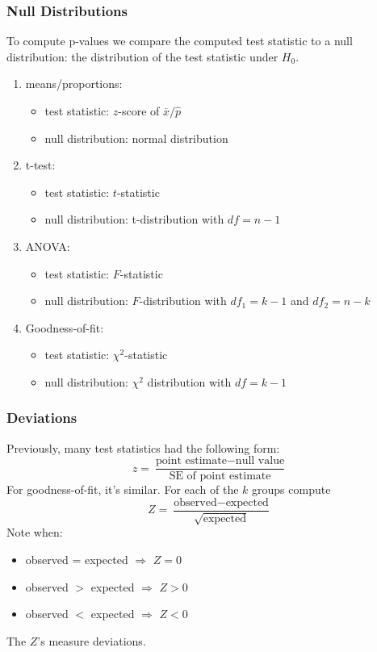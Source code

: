 \documentclass[handout]{beamer}
\newcommand{\blue}[1]{\textcolor{blue2}{#1}}
\newcommand{\xbar}{\overline{x}}
\begin{document}
\begin{frame}[fragile]
\frametitle{Null Distributions}
To compute p-values we compare the \blue{computed test statistic} to a \blue{null distribution}:  the distribution of the test statistic under $H_0$.

\begin{enumerate}
\pause\item \blue{means/proportions}:
\begin{itemize}
\item test statistic: $z$-score of $\xbar / \widehat{p}$
\item null distribution: normal distribution
\end{itemize}
\pause\item \blue{t-test}:  
\begin{itemize}
\item test statistic: $t$-statistic
\item null distribution: t-distribution with $df=n-1$
\end{itemize}
\pause\item \blue{ANOVA}:  
\begin{itemize}
\item test statistic: $F$-statistic 
\item null distribution: $F$-distribution with $df_1=k-1$ and $df_2 = n-k$
\end{itemize}
\pause\item \blue{Goodness-of-fit}:
\begin{itemize}
\item test statistic: $\chi^2$-statistic
\item null distribution: $\chi^2$ distribution with $df=k-1$
\end{itemize}
\end{enumerate}

\end{frame}


\begin{frame}[fragile]
\frametitle{Deviations}
%
%
Previously, many test statistics had the following form:  
\[
z = \frac{\mbox{point estimate} - \mbox{null value}}{\mbox{SE of point estimate}}
\]
\pause For goodness-of-fit, it's similar.  For each of the $k$ groups compute
\[
Z = \frac{\mbox{observed} - \mbox{expected}}{\sqrt{\mbox{expected}}}
\]
\pause Note when:
\begin{itemize}
\item observed = expected $\Rightarrow$ $Z=0$
\item observed $>$ expected $\Rightarrow$ $Z>0$
\item observed $<$ expected $\Rightarrow$ $Z<0$
\end{itemize}

The $Z$'s measure deviations.
\end{frame}
\end{document}
